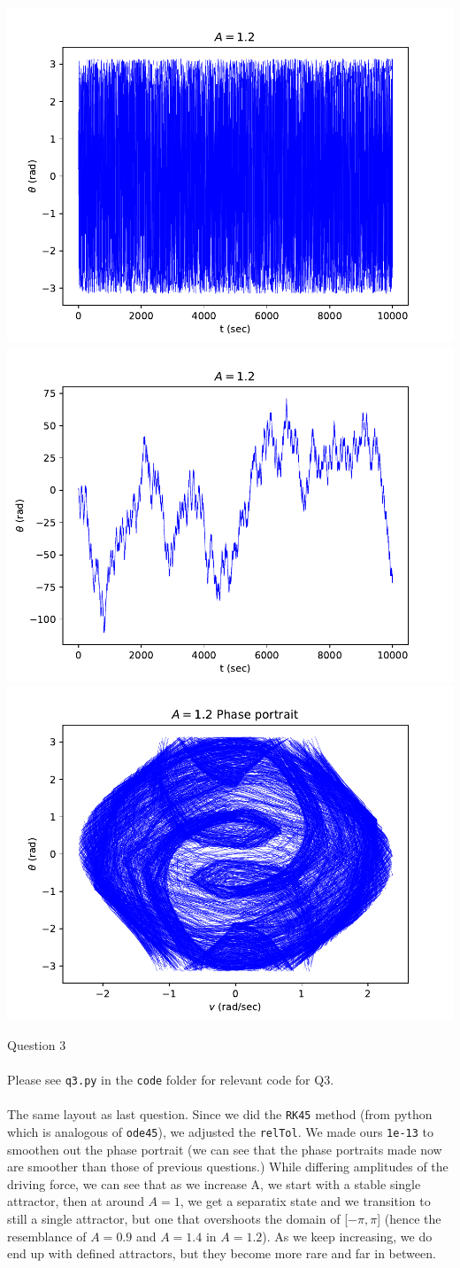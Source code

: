 \documentclass[10pt]{article} %
\begin{document}
\begin{center}
\includegraphics[width=.3\textwidth]{../figs/q2_A_12.pdf}
\includegraphics[width=.3\textwidth]{../figs/q2_A_12_no_wrap.pdf}
\includegraphics[width=.3\textwidth]{../figs/q2_A_12_phase.pdf}
\end{center}
\noindent \Large{Question 3}
\\ \\
\noindent \normalsize{Please see \texttt{q3.py} in the \texttt{code} folder for relevant code for Q3.}
\\ \\
The same layout as last question. Since we did the \texttt{RK45} method (from python which is analogous of \texttt{ode45}), we adjusted the \texttt{relTol}. We made ours \texttt{1e-13} to smoothen out the phase portrait (we can see that the phase portraits made now are smoother than those of previous questions.) While differing amplitudes of the driving force, we can see that as we increase A, we start with a stable single attractor, then at around $A=1$, we get a separatix state and we transition to still a single attractor, but one that overshoots the domain of [$-\pi, \pi$] (hence the resemblance of $A=0.9$ and $A=1.4$ in $A=1.2$). As we keep increasing, we do end up with defined attractors, but they become more rare and far in between.
\end{document}
